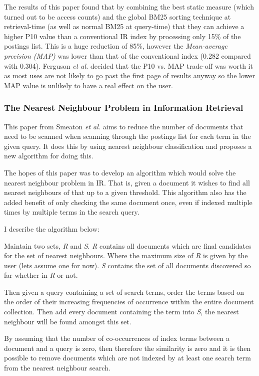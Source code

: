 \documentclass{acm_proc_article-sp}
\begin{document}
The results of this paper found that by combining the best static measure (which turned out to be access counts) and the global BM25 sorting technique at retrieval-time (as well as normal BM25 at query-time) that they can achieve a higher P10 value than a conventional IR index by processing only 15\% of the postings list. This is a huge reduction of 85\%, however the \emph{Mean-average precision (MAP)} was lower than that of the conventional index (0.282 compared with 0.304). Ferguson \emph{et al.} decided that the P10 vs. MAP trade-off was worth it as most uses are not likely to go past the first page of results anyway so the lower MAP value is unlikely to have a real effect on the user.

\subsubsection{The Nearest Neighbour Problem in Information Retrieval}

This paper from Smeaton \emph{et al.} \cite{Smeaton:1981} aims to reduce the number of documents that need to be scanned when scanning through the postings list for each term in the given query. It does this by using nearest neighbour classification and proposes a new algorithm for doing this.

The hopes of this paper was to develop an algorithm which would solve the nearest neighbour problem in IR. That is, given a document it wishes to find all nearest neighbours of that up to a given threshold. This algorithm also has the added benefit of only checking the same document once, even if indexed multiple times by multiple terms in the search query.

I describe the algorithm below:

Maintain two sets, \emph{R} and \emph{S}. \emph{R} contains all documents which are final candidates for the set of nearest neighbours. Where the maximum size of \emph{R} is given by the user (lets assume one for now). \emph{S} contains the set of all documents discovered so far whether in \emph{R} or not.

Then given a query containing a set of search terms, order the terms based on the order of their increasing frequencies of occurrence within the entire document collection. Then add every document containing the term into \emph{S}, the nearest neighbour will be found amongst this set.

By assuming that the number of co-occurrences of index terms between a document and a query is zero, then therefore the similarity is zero and it is then possible to remove documents which are not indexed by at least one search term from the nearest neighbour search.
\end{document}
